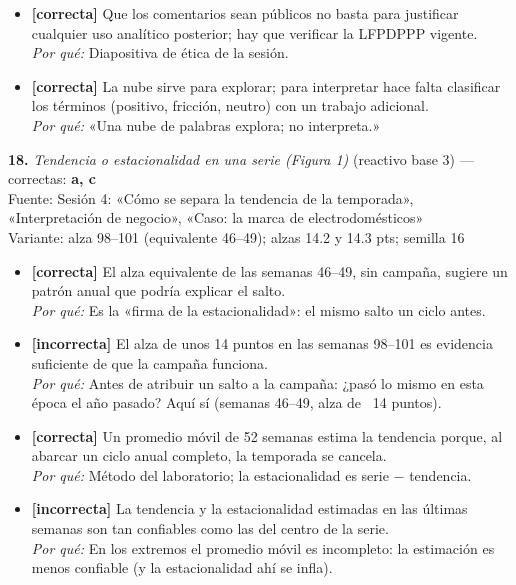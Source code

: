 \documentclass[10pt,letterpaper]{article}
\begin{document}
{\begin{itemize}[leftmargin=1.2em,itemsep=0pt,topsep=1pt,parsep=0pt]
\item[\textbf{c)}] {\footnotesize \textbf{[correcta]} Que los comentarios sean públicos no basta para justificar cualquier uso analítico posterior; hay que verificar la LFPDPPP vigente.\\ \textit{Por qué:} Diapositiva de ética de la sesión.}
\item[\textbf{d)}] {\footnotesize \textbf{[correcta]} La nube sirve para explorar; para interpretar hace falta clasificar los términos (positivo, fricción, neutro) con un trabajo adicional.\\ \textit{Por qué:} «Una nube de palabras explora; no interpreta.»}
\end{itemize}
\vspace{3pt}\noindent\textbf{18.} \textit{Tendencia o estacionalidad en una serie (Figura 1)} (reactivo base 3) — correctas: \textbf{a, c}\\[-1pt]
{\scriptsize Fuente: Sesión 4: «Cómo se separa la tendencia de la temporada», «Interpretación de negocio», «Caso: la marca de electrodomésticos»}
\\{\scriptsize Variante: alza 98--101 (equivalente 46--49); alzas 14.2 y 14.3 pts; semilla 16}
\begin{itemize}[leftmargin=1.2em,itemsep=0pt,topsep=1pt,parsep=0pt]
\item[\textbf{a)}] {\footnotesize \textbf{[correcta]} El alza equivalente de las semanas 46--49, sin campaña, sugiere un patrón anual que podría explicar el salto.\\ \textit{Por qué:} Es la «firma de la estacionalidad»: el mismo salto un ciclo antes.}
\item[\textbf{b)}] {\footnotesize \textbf{[incorrecta]} El alza de unos 14 puntos en las semanas 98--101 es evidencia suficiente de que la campaña funciona.\\ \textit{Por qué:} Antes de atribuir un salto a la campaña: ¿pasó lo mismo en esta época el año pasado? Aquí sí (semanas 46--49, alza de ~14 puntos).}
\item[\textbf{c)}] {\footnotesize \textbf{[correcta]} Un promedio móvil de 52 semanas estima la tendencia porque, al abarcar un ciclo anual completo, la temporada se cancela.\\ \textit{Por qué:} Método del laboratorio; la estacionalidad es serie $-$ tendencia.}
\item[\textbf{d)}] {\footnotesize \textbf{[incorrecta]} La tendencia y la estacionalidad estimadas en las últimas semanas son tan confiables como las del centro de la serie.\\ \textit{Por qué:} En los extremos el promedio móvil es incompleto: la estimación es menos confiable (y la estacionalidad ahí se infla).}

\end{itemize}}
\end{document}
